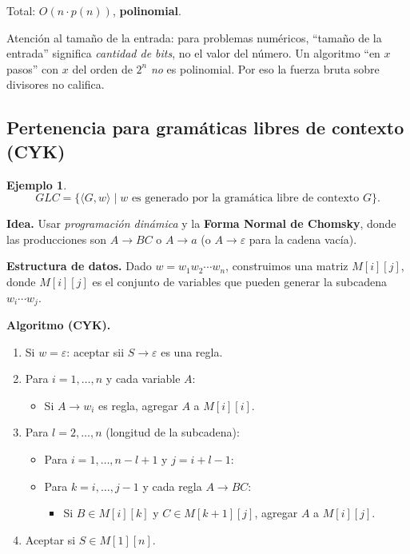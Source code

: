 \documentclass[11pt,a4paper]{article}
\theoremstyle{definicion}
\newtheorem{ejemplo}[definicion]{Ejemplo}
\newcommand{\enc}[1]{\langle #1 \rangle}
\begin{document}
Total: $O(n \cdot p(n))$, \textbf{polinomial}.

\begin{idea}
Atención al tamaño de la entrada: para problemas numéricos, ``tamaño de la entrada'' significa \emph{cantidad de bits}, no el valor del número. Un algoritmo ``en $x$ pasos'' con $x$ del orden de $2^n$ \emph{no} es polinomial. Por eso la fuerza bruta sobre divisores no califica.
\end{idea}

\subsection{Pertenencia para gramáticas libres de contexto (CYK)}

\begin{ejemplo}
\[
\mathit{GLC} = \{ \enc{G, w} \mid w \text{ es generado por la gramática libre de contexto } G\}.
\]
\end{ejemplo}

\textbf{Idea.} Usar \emph{programación dinámica} y la \textbf{Forma Normal de Chomsky}, donde las producciones son $A \to BC$ o $A \to a$ (o $A \to \varepsilon$ para la cadena vacía).

\textbf{Estructura de datos.} Dado $w = w_1 w_2 \cdots w_n$, construimos una matriz $M[i][j]$, donde $M[i][j]$ es el conjunto de variables que pueden generar la subcadena $w_i \cdots w_j$.

\textbf{Algoritmo (CYK).}
\begin{enumerate}
    \item Si $w = \varepsilon$: aceptar sii $S \to \varepsilon$ es una regla.
    \item Para $i = 1, \dots, n$ y cada variable $A$:
    \begin{itemize}
        \item Si $A \to w_i$ es regla, agregar $A$ a $M[i][i]$.
    \end{itemize}
    \item Para $l = 2, \dots, n$ (longitud de la subcadena):
    \begin{itemize}
        \item Para $i = 1, \dots, n - l + 1$ y $j = i + l - 1$:
        \item Para $k = i, \dots, j - 1$ y cada regla $A \to BC$:
        \begin{itemize}
            \item Si $B \in M[i][k]$ y $C \in M[k+1][j]$, agregar $A$ a $M[i][j]$.
        \end{itemize}
    \end{itemize}
    \item Aceptar si $S \in M[1][n]$.
\end{enumerate}
\end{document}
